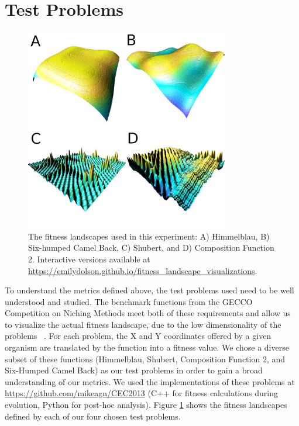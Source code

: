 \documentclass[letterpaper]{article}
\begin{document}
\section{Test Problems}
\begin{figure}
\includegraphics[width=3.5in]{figs/landscapes.png}
\caption{\small The fitness landscapes used in this experiment: A) Himmelblau, B) Six-humped Camel Back, C) Shubert, and D) Composition Function 2. Interactive versions available at \url{https://emilydolson.github.io/fitness_landscape_visualizations}.}
\label{fig:landscapes}
\end{figure}

To understand the metrics defined above, the test problems used need to be well understood and studied. The benchmark functions from the GECCO Competition on Niching Methods meet both of these requirements and allow us to visualize the actual fitness landscape, due to the low dimensionality of the problems ~\citep{li_benchmark_2013}. For each problem, the X and Y coordinates offered by a given organism are translated by the function into a fitness value. We chose a diverse subset of these functions (Himmelblau, Shubert, Composition Function 2, and Six-Humped Camel Back) as our test problems in order to gain a broad understanding of our metrics. We used the implementations of these problems at \url{https://github.com/mikeagn/CEC2013} (C++ for fitness calculations during evolution, Python for post-hoc analysis). Figure \ref{fig:landscapes} shows the fitness landscapes defined by each of our four chosen test problems. 
\end{document}
